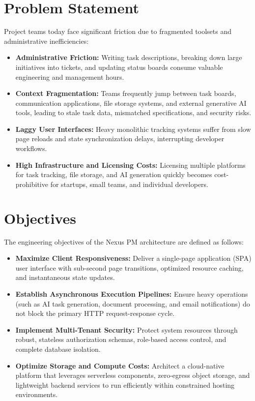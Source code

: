 \section{Problem Statement}
Project teams today face significant friction due to fragmented toolsets and administrative inefficiencies:
\begin{itemize}
    \item \textbf{Administrative Friction:} Writing task descriptions, breaking down large initiatives into tickets, and updating status boards consume valuable engineering and management hours.
    \item \textbf{Context Fragmentation:} Teams frequently jump between task boards, communication applications, file storage systems, and external generative AI tools, leading to stale task data, mismatched specifications, and security risks.
    \item \textbf{Laggy User Interfaces:} Heavy monolithic tracking systems suffer from slow page reloads and state synchronization delays, interrupting developer workflows.
    \item \textbf{High Infrastructure and Licensing Costs:} Licensing multiple platforms for task tracking, file storage, and AI generation quickly becomes cost-prohibitive for startups, small teams, and individual developers.
\end{itemize}

\section{Objectives}
The engineering objectives of the Nexus PM architecture are defined as follows:
\begin{itemize}
    \item \textbf{Maximize Client Responsiveness:} Deliver a single-page application (SPA) user interface with sub-second page transitions, optimized resource caching, and instantaneous state updates.
    \item \textbf{Establish Asynchronous Execution Pipelines:} Ensure heavy operations (such as AI task generation, document processing, and email notifications) do not block the primary HTTP request-response cycle.
    \item \textbf{Implement Multi-Tenant Security:} Protect system resources through robust, stateless authorization schemas, role-based access control, and complete database isolation.
    \item \textbf{Optimize Storage and Compute Costs:} Architect a cloud-native platform that leverages serverless components, zero-egress object storage, and lightweight backend services to run efficiently within constrained hosting environments.
\end{itemize}


